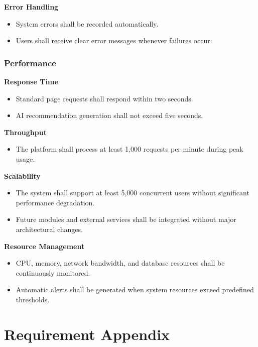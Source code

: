\textbf{Error Handling}

\begin{itemize}
    \item System errors shall be recorded automatically.
    \item Users shall receive clear error messages whenever failures occur.
\end{itemize}

\subsubsection{Performance}

\textbf{Response Time}

\begin{itemize}
    \item Standard page requests shall respond within two seconds.
    \item AI recommendation generation shall not exceed five seconds.
\end{itemize}

\textbf{Throughput}

\begin{itemize}
    \item The platform shall process at least 1,000 requests per minute during peak usage.
\end{itemize}

\textbf{Scalability}

\begin{itemize}
    \item The system shall support at least 5,000 concurrent users without significant performance degradation.
    \item Future modules and external services shall be integrated without major architectural changes.
\end{itemize}

\textbf{Resource Management}

\begin{itemize}
    \item CPU, memory, network bandwidth, and database resources shall be continuously monitored.
    \item Automatic alerts shall be generated when system resources exceed predefined thresholds.
\end{itemize}

\section{Requirement Appendix}

